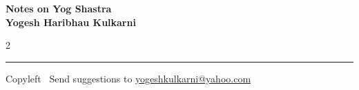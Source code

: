 \documentclass[9pt,a4paper,landscape]{article}
\begin{document}
\footnotesize


\begin{center}
\Large{\textbf{Notes on Yog Shastra\\ Yogesh Haribhau Kulkarni}}  
\end{center}

\begin{multicols}{2}

\end{multicols}

\rule{\linewidth}{0.25pt}
\scriptsize
Copyleft \textcopyleft\  Send suggestions to 
\href{http://www.yogeshkulkarni.com}{yogeshkulkarni@yahoo.com}
\end{document}
